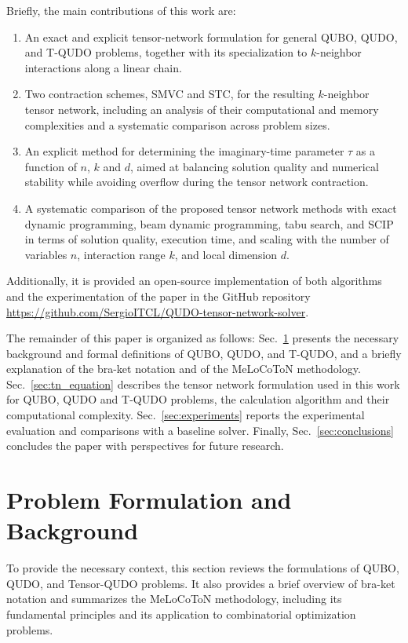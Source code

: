 \documentclass[%
 reprint,
 amsmath,amssymb,
 aps,
 pra,showkeys,
]{revtex4-2}
\begin{document}
Briefly, the main contributions of this work are:
\begin{enumerate}
    \item An exact and explicit tensor-network formulation for general QUBO,
    QUDO, and T-QUDO problems, together with its specialization
    to $k$-neighbor interactions along a linear chain.
    
    \item Two contraction schemes, SMVC and STC, for the resulting
    $k$-neighbor tensor network, including an analysis of their computational
    and memory complexities and a systematic comparison across problem sizes.

    \item An explicit method for determining the imaginary-time parameter
    $\tau$ as a function of $n$, $k$ and $d$, aimed at balancing
    solution quality and numerical stability while avoiding overflow during the tensor network contraction.
    \item A systematic comparison of the proposed tensor network methods
    with exact dynamic programming, beam dynamic programming, tabu search,
    and SCIP in terms of solution quality, execution time, and scaling with
    the number of variables $n$, interaction range $k$, and local dimension $d$.
\end{enumerate}
Additionally, it is provided an open-source implementation of both algorithms and the experimentation of the paper in the GitHub repository \href{https://github.com/SergioITCL/QUDO-tensor-network-solver}{https://github.com/SergioITCL/QUDO-tensor-network-solver}.

The remainder of this paper is organized as follows: Sec.~\ref{sec:background} presents the necessary background and formal definitions of QUBO, QUDO, and T-QUDO, and a briefly explanation of the bra-ket notation and of the MeLoCoToN methodology. Sec.~\ref{sec:tn_equation} describes the tensor network formulation used in this work for QUBO, QUDO and T-QUDO problems, the calculation algorithm and their computational complexity. Sec.~\ref{sec:experiments} reports the experimental evaluation and comparisons with a baseline solver. Finally, Sec.~\ref{sec:conclusions} concludes the paper with perspectives for future research.


\section{Problem Formulation and Background}\label{sec:background}
To provide the necessary context, this section reviews the formulations of QUBO, QUDO, and Tensor-QUDO problems. It also provides a brief overview of bra-ket notation and summarizes the MeLoCoToN methodology, including its fundamental principles and its application to combinatorial optimization problems.
\end{document}
